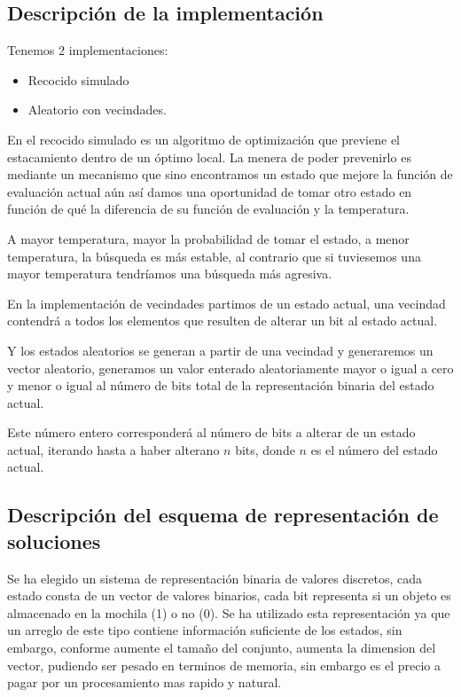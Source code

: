 \documentclass{article}
\begin{document}
\subsection*{Descripción de la implementación}
Tenemos 2 implementaciones:
\begin{itemize}
	\item Recocido simulado
	\item Aleatorio con vecindades.
\end{itemize}

En el recocido simulado es un algoritmo de optimización que previene el estacamiento dentro de un óptimo local. 
La menera de poder prevenirlo es mediante un mecanismo que sino encontramos un estado que mejore la función de evaluación actual aún así damos una oportunidad de tomar otro estado en función de qué la diferencia de su función de evaluación y la temperatura.

A mayor temperatura, mayor la probabilidad de tomar el estado, a menor temperatura, la búsqueda es más estable, al contrario que si tuviesemos una mayor temperatura tendríamos una búsqueda más agresiva.

En la implementación de vecindades partimos de un estado actual, una vecindad contendrá a todos los elementos que resulten de alterar un bit al estado actual.

Y los estados aleatorios se generan a partir de una vecindad y generaremos un vector aleatorio, generamos un valor enterado aleatoriamente mayor o igual a cero y menor o igual al número de bits total de la representación binaria del estado actual.

Este número entero corresponderá al número de bits a alterar de un estado actual, iterando hasta a haber alterano $n$ bits, donde $n$ es el número del estado actual.


\subsection*{Descripción del esquema de representación de soluciones}
Se ha elegido un sistema de representación binaria de valores discretos, cada estado consta de un vector de valores binarios, cada bit representa si un objeto
	es almacenado en la mochila (1) o no (0). Se ha utilizado esta representación ya que un arreglo de este tipo contiene información suficiente de los estados, sin embargo, 
	conforme aumente el tamaño del conjunto, aumenta la dimension del vector, pudiendo ser pesado en terminos de memoria, sin embargo es el precio a pagar por un procesamiento 
	mas rapido y natural.
\end{document}
